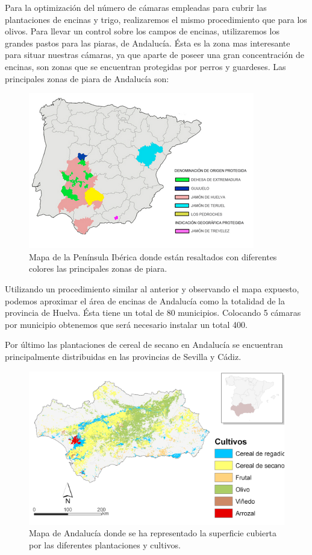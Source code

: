 \documentclass[12pt,oneside,a4paper]{article}
\numberwithin{figure}{section}
\begin{document}
Para la optimización del número de cámaras empleadas para cubrir las plantaciones de encinas y trigo, realizaremos el mismo procedimiento que para los olivos. Para llevar un control sobre los campos de encinas, utilizaremos los grandes pastos para las piaras, de Andalucía. Ésta es la zona mas interesante para situar nuestras cámaras, ya que 
aparte de poseer una gran concentración de encinas, son zonas que se encuentran protegidas por perros y guardeses. Las principales zonas de piara de Andalucía son:

\begin{figure}[H]
\begin{center}
\includegraphics[scale=.9]{Apendice2.png}
\caption{Mapa de la Península Ibérica donde están resaltados con diferentes colores las principales zonas de piara.}
\end{center}
\end{figure}

Utilizando un procedimiento similar al anterior y observando el mapa expuesto, podemos aproximar el área de encinas de Andalucía como la totalidad de la provincia de Huelva. Ésta tiene un total de 80 municipios. Colocando 5 cámaras por municipio obtenemos que será necesario instalar un total 400.

Por último las plantaciones de cereal de secano en Andalucía se encuentran principalmente distribuidas en las provincias de Sevilla y Cádiz.

\begin{figure}[H]
\begin{center}
\includegraphics[scale=.9]{Apendice3.png}
\caption{Mapa de Andalucía donde se ha representado la superficie cubierta por las diferentes plantaciones y cultivos.}
\end{center}
\end{figure}
\end{document}
